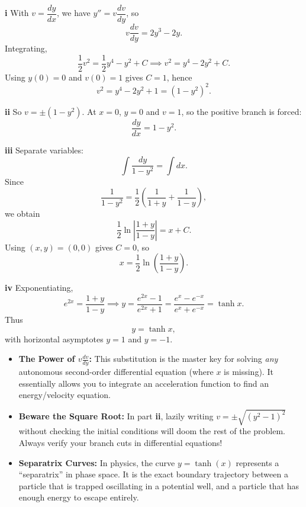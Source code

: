 \begin{solution}
\textbf{i} With $v=\dfrac{dy}{dx}$, we have $y''=v\dfrac{dv}{dy}$, so
\[
v\frac{dv}{dy}=2y^3-2y.
\]
Integrating,
\[
\frac12v^2=\frac12y^4-y^2+C
\implies
v^2=y^4-2y^2+C.
\]
Using $y(0)=0$ and $v(0)=1$ gives $C=1$, hence
\[
v^2=y^4-2y^2+1=(1-y^2)^2.
\]

\textbf{ii} So $v=\pm(1-y^2)$. At $x=0$, $y=0$ and $v=1$, so the positive branch is forced:
\[
\boxed{\frac{dy}{dx}=1-y^2}.
\]

\textbf{iii} Separate variables:
\[
\int \frac{dy}{1-y^2}=\int dx.
\]
Since
\[
\frac{1}{1-y^2}=\frac12\left(\frac{1}{1+y}+\frac{1}{1-y}\right),
\]
we obtain
\[
\frac12\ln\left|\frac{1+y}{1-y}\right|=x+C.
\]
Using $(x,y)=(0,0)$ gives $C=0$, so
\[
\boxed{x=\frac12\ln\left(\frac{1+y}{1-y}\right)}.
\]

\textbf{iv} Exponentiating,
\[
e^{2x}=\frac{1+y}{1-y}
\implies
y=\frac{e^{2x}-1}{e^{2x}+1}
=\frac{e^x-e^{-x}}{e^x+e^{-x}}
=\tanh x.
\]
Thus
\[
\boxed{y=\tanh x},
\]
with horizontal asymptotes $\boxed{y=1}$ and $\boxed{y=-1}$.
\end{solution}

\begin{takeaways}
\begin{itemize}[leftmargin=*]
    \item \textbf{The Power of $v \frac{dv}{dy}$:} This substitution is the master key for solving \textit{any} autonomous second-order differential equation (where $x$ is missing). It essentially allows you to integrate an acceleration function to find an energy/velocity equation.
    \item \textbf{Beware the Square Root:} In part \textbf{ii}, lazily writing $v = \pm \sqrt{(y^2-1)^2}$ without checking the initial conditions will doom the rest of the problem. Always verify your branch cuts in differential equations!
    \item \textbf{Separatrix Curves:} In physics, the curve $y = \tanh(x)$ represents a ``separatrix'' in phase space. It is the exact boundary trajectory between a particle that is trapped oscillating in a potential well, and a particle that has enough energy to escape entirely.
\end{itemize}
\end{takeaways}

